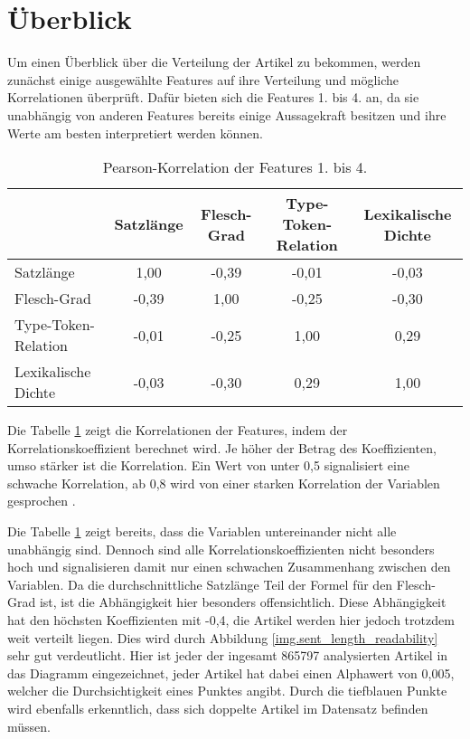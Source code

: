 \section{Überblick}
Um einen Überblick über die Verteilung der Artikel zu bekommen, werden zunächst einige ausgewählte Features auf ihre Verteilung und mögliche Korrelationen überprüft. Dafür bieten sich die Features 1. bis 4. an, da sie unabhängig von anderen Features bereits einige Aussagekraft besitzen und ihre Werte am besten interpretiert werden können.

\begin{table}[t]
\centering
\begin{spacing}{1.25}
\begin{tabular}[t]{lcccc}
\toprule
~ & Satzlänge & Flesch-Grad & Type-Token-Relation & Lexikalische Dichte\\
\midrule
Satzlänge & 1,00 & -0,39 & -0,01 & -0,03\\
Flesch-Grad & -0,39 & 1,00 & -0,25 & -0,30\\
Type-Token-Relation & -0,01 & -0,25 & 1,00 & 0,29\\
Lexikalische Dichte & -0,03 & -0,30 & 0,29 & 1,00\\
\bottomrule
\end{tabular}
\caption{Pearson-Korrelation der Features 1. bis 4.}
\label{table.correlation}
\end{spacing}
\end{table}

Die Tabelle \ref{table.correlation} zeigt die Korrelationen der Features, indem der Korrelationskoeffizient berechnet wird. Je höher der Betrag des Koeffizienten, umso stärker ist die Korrelation. Ein Wert von unter 0,5 signalisiert eine schwache Korrelation, ab 0,8 wird von einer starken Korrelation der Variablen gesprochen \cite[S.~268-273]{burkschat2012beschreibende}.

Die Tabelle \ref{table.correlation} zeigt bereits, dass die Variablen untereinander nicht alle unabhängig sind. Dennoch sind alle Korrelationskoeffizienten nicht besonders hoch und signalisieren damit nur einen schwachen Zusammenhang zwischen den Variablen. Da die durchschnittliche Satzlänge Teil der Formel für den Flesch-Grad ist, ist die Abhängigkeit hier besonders offensichtlich. Diese Abhängigkeit hat den höchsten Koeffizienten mit -0,4, die Artikel werden hier jedoch trotzdem weit verteilt liegen. Dies wird durch Abbildung \ref{img.sent_length_readability} sehr gut verdeutlicht. Hier ist jeder der ingesamt 865797 analysierten Artikel in das Diagramm eingezeichnet, jeder Artikel hat dabei einen Alphawert von 0,005, welcher die Durchsichtigkeit eines Punktes angibt. Durch die tiefblauen Punkte wird ebenfalls erkenntlich, dass sich doppelte Artikel im Datensatz befinden müssen.

